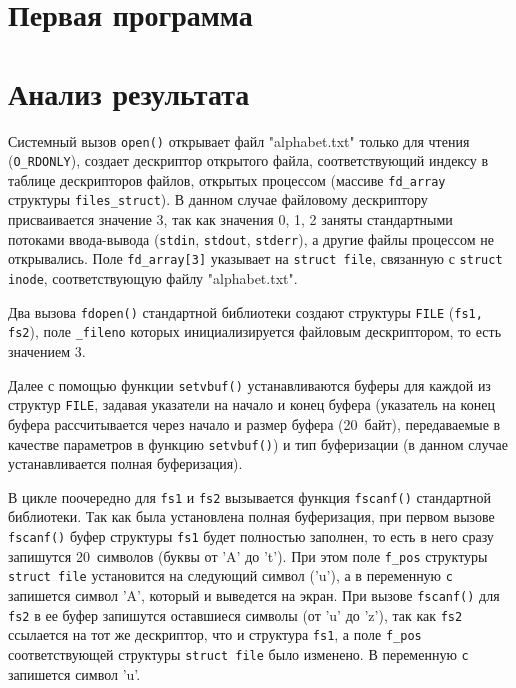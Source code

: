 \section{Первая программа}

\vspace{-0.5cm}


\clearpage
{}


\vspace{-0.7cm}
\section*{Анализ результата}
\vspace{-0.2cm}

Системный вызов \texttt{open()} открывает файл "alphabet.txt" только для чтения
(\texttt{O\_RDONLY}), создает дескриптор открытого файла, соответствующий
индексу в таблице дескрипторов файлов, открытых процессом (массиве
\texttt{fd\_array } структуры \texttt{files\_struct}).  В данном случае
файловому дескриптору присваивается значение 3, так как значения 0, 1, 2 заняты
стандартными потоками ввода-вывода (\texttt{stdin}, \texttt{stdout},
\texttt{stderr}), а другие файлы процессом не открывались. Поле
\texttt{fd\_array[3]} указывает на \texttt{struct file}, связанную с
\texttt{struct inode}, соответствующую файлу "alphabet.txt".

Два вызова \texttt{fdopen()} стандартной библиотеки создают структуры
\texttt{FILE} (\texttt{fs1, fs2}), поле \texttt{\_fileno} которых
инициализируется файловым дескриптором, то есть значением 3.

Далее с помощью функции \texttt{setvbuf()} устанавливаются буферы для каждой из
структур \texttt{FILE}, задавая указатели на начало и конец буфера (указатель на
конец буфера рассчитывается через начало и размер буфера (20~байт), передаваемые
в качестве параметров в функцию \texttt{setvbuf()}) и тип буферизации (в данном
случае устанавливается полная буферизация).

В цикле поочередно для \texttt{fs1} и \texttt{fs2} вызывается функция
\texttt{fscanf()} стандартной библиотеки. Так как была установлена полная
буферизация, при первом вызове \texttt{fscanf()} буфер структуры \texttt{fs1}
будет полностью заполнен, то есть в него сразу запишутся 20~символов (буквы от
'A' до 't'). При этом поле \texttt{f\_pos} структуры \texttt{struct file}
установится на следующий символ ('u'), а в переменную \texttt{c} запишется
символ 'A', который и выведется на экран. При вызове \texttt{fscanf()} для
\texttt{fs2} в ее буфер запишутся оставшиеся символы (от 'u' до 'z'), так как
\texttt{fs2} ссылается на тот же дескриптор, что и структура \texttt{fs1}, а
поле \texttt{f\_pos} соответствующей структуры \texttt{struct file} было
изменено. В переменную \texttt{c} запишется символ 'u'.

